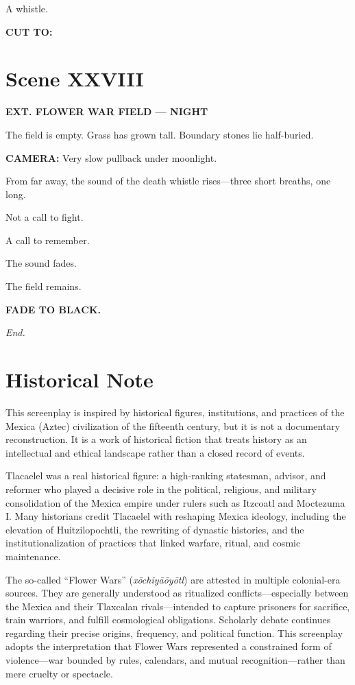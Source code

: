 \documentclass[12pt]{article}
\begin{document}
A whistle.

\textbf{CUT TO:}

\section*{Scene XXVIII}

\textbf{EXT. FLOWER WAR FIELD — NIGHT}

The field is empty. Grass has grown tall. Boundary stones lie half-buried.

\textbf{CAMERA:} Very slow pullback under moonlight.

From far away, the sound of the death whistle rises—three short breaths, one long.

Not a call to fight.

A call to remember.

The sound fades.

The field remains.

\textbf{FADE TO BLACK.}

\bigskip

\begin{center}
\textit{End.}
\end{center}

\newpage
\section*{Historical Note}

This screenplay is inspired by historical figures, institutions, and practices of the Mexica (Aztec) civilization of the fifteenth century, but it is not a documentary reconstruction. It is a work of historical fiction that treats history as an intellectual and ethical landscape rather than a closed record of events.

Tlacaelel was a real historical figure: a high-ranking statesman, advisor, and reformer who played a decisive role in the political, religious, and military consolidation of the Mexica empire under rulers such as Itzcoatl and Moctezuma I. Many historians credit Tlacaelel with reshaping Mexica ideology, including the elevation of Huitzilopochtli, the rewriting of dynastic histories, and the institutionalization of practices that linked warfare, ritual, and cosmic maintenance.

The so-called “Flower Wars” (\textit{xōchiyāōyōtl}) are attested in multiple colonial-era sources. They are generally understood as ritualized conflicts—especially between the Mexica and their Tlaxcalan rivals—intended to capture prisoners for sacrifice, train warriors, and fulfill cosmological obligations. Scholarly debate continues regarding their precise origins, frequency, and political function. This screenplay adopts the interpretation that Flower Wars represented a constrained form of violence—war bounded by rules, calendars, and mutual recognition—rather than mere cruelty or spectacle.
\end{document}
